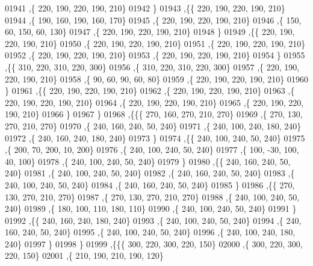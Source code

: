 \begin{DoxyCode}
01941     ,\{   220,   190,   220,   190,   210\}
01942     \}
01943    ,\{\{   220,   190,   220,   190,   210\}
01944     ,\{   190,   160,   190,   160,   170\}
01945     ,\{   220,   190,   220,   190,   210\}
01946     ,\{   150,    60,   150,    60,   130\}
01947     ,\{   220,   190,   220,   190,   210\}
01948     \}
01949    ,\{\{   220,   190,   220,   190,   210\}
01950     ,\{   220,   190,   220,   190,   210\}
01951     ,\{   220,   190,   220,   190,   210\}
01952     ,\{   220,   190,   220,   190,   210\}
01953     ,\{   220,   190,   220,   190,   210\}
01954     \}
01955    ,\{\{   310,   220,   310,   220,   300\}
01956     ,\{   310,   220,   310,   220,   300\}
01957     ,\{   220,   190,   220,   190,   210\}
01958     ,\{    90,    60,    90,    60,    80\}
01959     ,\{   220,   190,   220,   190,   210\}
01960     \}
01961    ,\{\{   220,   190,   220,   190,   210\}
01962     ,\{   220,   190,   220,   190,   210\}
01963     ,\{   220,   190,   220,   190,   210\}
01964     ,\{   220,   190,   220,   190,   210\}
01965     ,\{   220,   190,   220,   190,   210\}
01966     \}
01967    \}
01968   ,\{\{\{   270,   160,   270,   210,   270\}
01969     ,\{   270,   130,   270,   210,   270\}
01970     ,\{   240,   160,   240,    50,   240\}
01971     ,\{   240,   100,   240,   180,   240\}
01972     ,\{   240,   160,   240,   180,   240\}
01973     \}
01974    ,\{\{   240,   100,   240,    50,   240\}
01975     ,\{   200,    70,   200,    10,   200\}
01976     ,\{   240,   100,   240,    50,   240\}
01977     ,\{   100,   -30,   100,    40,   100\}
01978     ,\{   240,   100,   240,    50,   240\}
01979     \}
01980    ,\{\{   240,   160,   240,    50,   240\}
01981     ,\{   240,   100,   240,    50,   240\}
01982     ,\{   240,   160,   240,    50,   240\}
01983     ,\{   240,   100,   240,    50,   240\}
01984     ,\{   240,   160,   240,    50,   240\}
01985     \}
01986    ,\{\{   270,   130,   270,   210,   270\}
01987     ,\{   270,   130,   270,   210,   270\}
01988     ,\{   240,   100,   240,    50,   240\}
01989     ,\{   180,   100,   110,   180,   110\}
01990     ,\{   240,   100,   240,    50,   240\}
01991     \}
01992    ,\{\{   240,   160,   240,   180,   240\}
01993     ,\{   240,   100,   240,    50,   240\}
01994     ,\{   240,   160,   240,    50,   240\}
01995     ,\{   240,   100,   240,    50,   240\}
01996     ,\{   240,   100,   240,   180,   240\}
01997     \}
01998    \}
01999   ,\{\{\{   300,   220,   300,   220,   150\}
02000     ,\{   300,   220,   300,   220,   150\}
02001     ,\{   210,   190,   210,   190,   120\}

\end{DoxyCode}
